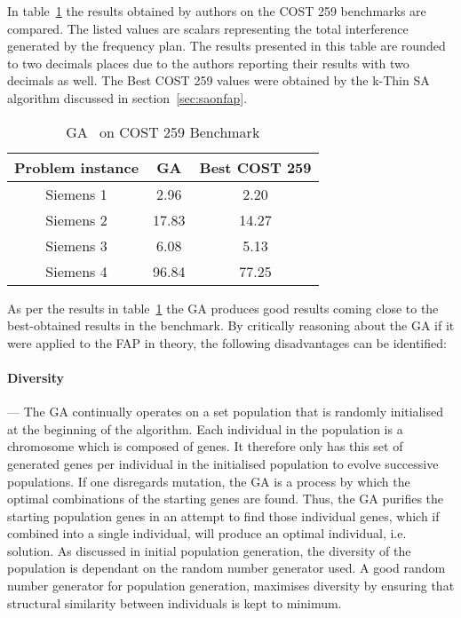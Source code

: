 In table~\ref{tab:GA} the results obtained by authors on the \gls{COST} 259 benchmarks are compared. The listed values are scalars representing the total interference generated by the frequency plan. The results presented in this table are rounded to two decimals places due to the authors reporting their results with two decimals as well. The Best \gls{COST} 259 values were obtained by the k-Thin SA algorithm discussed in section~\ref{sec:saonfap}.
\begin{table}[H]
\centering
	\begin{tabular}{| c | c | c |}
	\hline
	Problem instance & \gls{GA} & Best \gls{COST} 259 \\ \hline
	Siemens 1 & 2.96 & 2.20 \\ \hline
	Siemens 2 & 17.83 & 14.27 \\ \hline
	Siemens 3 & 6.08 & 5.13 \\ \hline
	Siemens 4 & 96.84 & 77.25 \\ \hline
	\end{tabular}
    \caption{GA~\cite{ProblemDecompMIFAP} on \gls{COST} 259 Benchmark}
\label{tab:GA}
\end{table}

As per the results in table~\ref{tab:GA} the \gls{GA} produces good results coming close to the best-obtained results in the benchmark. By critically reasoning about the \gls{GA} if it were applied to the \gls{FAP} in theory, the following disadvantages can be identified:

\paragraph{Diversity}
--- The \gls{GA} continually operates on a set population that is randomly initialised at the beginning of the algorithm. Each individual in the population is a chromosome which is composed of genes. It therefore only has this set of generated genes per individual in the initialised population to evolve successive populations.
If one disregards mutation, the \gls{GA} is a process by which the optimal combinations of the starting genes are found. Thus, the \gls{GA} purifies the starting population genes in an attempt to find those individual genes, which if combined into a single individual, will produce an optimal individual, i.e. solution. As discussed in initial population generation, the diversity of the population is dependant on the random number generator used. A good random number generator for population generation, maximises diversity by ensuring that structural similarity between individuals is kept to minimum.
